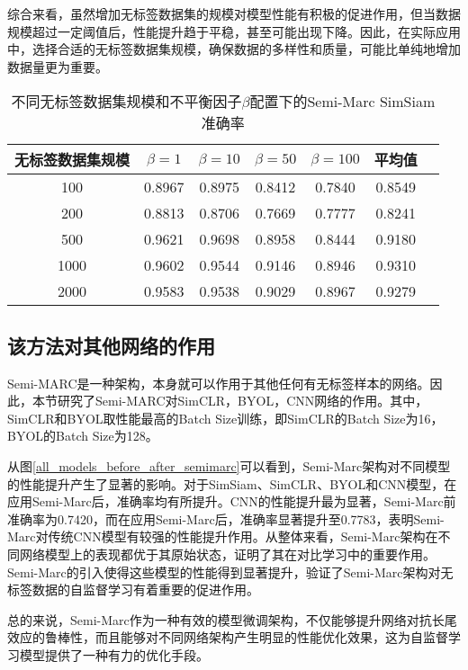 \documentclass[master]{thesis-uestc}
\begin{document}
综合来看，虽然增加无标签数据集的规模对模型性能有积极的促进作用，但当数据规模超过一定阈值后，性能提升趋于平稳，甚至可能出现下降。因此，在实际应用中，选择合适的无标签数据集规模，确保数据的多样性和质量，可能比单纯地增加数据量更为重要。

\begin{table}[h]
    \centering
    \caption{不同无标签数据集规模和不平衡因子$\beta$配置下的Semi-Marc SimSiam准确率}
    \begin{tabular}{ccccccc}
    \hline
    \textbf{无标签数据集规模} & \textbf{$\beta = 1$} & \textbf{$\beta = 10$} & \textbf{$\beta = 50$} & \textbf{$\beta = 100$} & \textbf{平均值} \\
    \hline
    100   & 0.8967 & 0.8975 & 0.8412 & 0.7840 & 0.8549 \\
    200   & 0.8813 & 0.8706 & 0.7669 & 0.7777 & 0.8241 \\
    500   & 0.9621 & 0.9698 & 0.8958 & 0.8444 & 0.9180 \\
    1000  & 0.9602 & 0.9544 & 0.9146 & 0.8946 & 0.9310 \\
    2000  & 0.9583 & 0.9538 & 0.9029 & 0.8967 & 0.9279 \\
    \hline
    \end{tabular}
    \label{tab:semi_marc_ssv_size}
\end{table}

\subsection{该方法对其他网络的作用}
Semi-MARC是一种架构，本身就可以作用于其他任何有无标签样本的网络。因此，本节研究了Semi-MARC对SimCLR，BYOL，CNN网络的作用。其中，SimCLR和BYOL取性能最高的Batch Size训练，即SimCLR的Batch Size为16，BYOL的Batch Size为128。

从图\ref{all_models_before_after_semimarc}可以看到，Semi-Marc架构对不同模型的性能提升产生了显著的影响。对于SimSiam、SimCLR、BYOL和CNN模型，在应用Semi-Marc后，准确率均有所提升。CNN的性能提升最为显著，Semi-Marc前准确率为0.7420，而在应用Semi-Marc后，准确率显著提升至0.7783，表明Semi-Marc对传统CNN模型有较强的性能提升作用。从整体来看，Semi-Marc架构在不同网络模型上的表现都优于其原始状态，证明了其在对比学习中的重要作用。Semi-Marc的引入使得这些模型的性能得到显著提升，验证了Semi-Marc架构对无标签数据的自监督学习有着重要的促进作用。

总的来说，Semi-Marc作为一种有效的模型微调架构，不仅能够提升网络对抗长尾效应的鲁棒性，而且能够对不同网络架构产生明显的性能优化效果，这为自监督学习模型提供了一种有力的优化手段。
\end{document}
